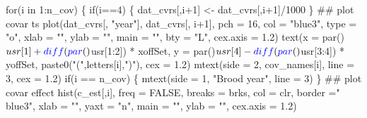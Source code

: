 \documentclass[11pt,]{article}
\newenvironment{Shaded}{}{}
\newcommand{\CommentTok}[1]{\textcolor[rgb]{0.00,0.50,0.00}{#1}}
\newcommand{\ControlFlowTok}[1]{\textcolor[rgb]{0.00,0.00,1.00}{#1}}
\newcommand{\DataTypeTok}[1]{#1}
\newcommand{\DecValTok}[1]{#1}
\newcommand{\FloatTok}[1]{#1}
\newcommand{\KeywordTok}[1]{\textcolor[rgb]{0.00,0.00,1.00}{#1}}
\newcommand{\NormalTok}[1]{#1}
\newcommand{\OperatorTok}[1]{#1}
\newcommand{\OtherTok}[1]{\textcolor[rgb]{1.00,0.25,0.00}{#1}}
\newcommand{\StringTok}[1]{\textcolor[rgb]{0.00,0.50,0.50}{#1}}
\begin{document}
\begin{Shaded}
\begin{Highlighting}[]
\ControlFlowTok{for}\NormalTok{(i }\ControlFlowTok{in} \DecValTok{1}\OperatorTok{:}\NormalTok{n_cov) \{}
  \ControlFlowTok{if}\NormalTok{(i}\OperatorTok{==}\DecValTok{4}\NormalTok{) \{}
\NormalTok{    dat_cvrs[,i}\OperatorTok{+}\DecValTok{1}\NormalTok{] <-}\StringTok{ }\NormalTok{dat_cvrs[,i}\OperatorTok{+}\DecValTok{1}\NormalTok{]}\OperatorTok{/}\DecValTok{1000}
\NormalTok{  \}}
  \CommentTok{## plot covar ts}
  \KeywordTok{plot}\NormalTok{(dat_cvrs[, }\StringTok{"year"}\NormalTok{], dat_cvrs[, i}\OperatorTok{+}\DecValTok{1}\NormalTok{],}
       \DataTypeTok{pch =} \DecValTok{16}\NormalTok{, }\DataTypeTok{col =} \StringTok{"blue3"}\NormalTok{, }\DataTypeTok{type =} \StringTok{"o"}\NormalTok{,}
       \DataTypeTok{xlab =} \StringTok{""}\NormalTok{, }\DataTypeTok{ylab =} \StringTok{""}\NormalTok{, }\DataTypeTok{main =} \StringTok{""}\NormalTok{, }\DataTypeTok{bty =} \StringTok{"L"}\NormalTok{,}
       \DataTypeTok{cex.axis =} \FloatTok{1.2}\NormalTok{)}
  \KeywordTok{text}\NormalTok{(}\DataTypeTok{x =} \KeywordTok{par}\NormalTok{()}\OperatorTok{$}\NormalTok{usr[}\DecValTok{1}\NormalTok{] }\OperatorTok{+}\StringTok{ }\KeywordTok{diff}\NormalTok{(}\KeywordTok{par}\NormalTok{()}\OperatorTok{$}\NormalTok{usr[}\DecValTok{1}\OperatorTok{:}\DecValTok{2}\NormalTok{]) }\OperatorTok{*}\StringTok{ }\NormalTok{xoffSet,}
       \DataTypeTok{y =} \KeywordTok{par}\NormalTok{()}\OperatorTok{$}\NormalTok{usr[}\DecValTok{4}\NormalTok{] }\OperatorTok{-}\StringTok{ }\KeywordTok{diff}\NormalTok{(}\KeywordTok{par}\NormalTok{()}\OperatorTok{$}\NormalTok{usr[}\DecValTok{3}\OperatorTok{:}\DecValTok{4}\NormalTok{]) }\OperatorTok{*}\StringTok{ }\NormalTok{yoffSet,}
       \KeywordTok{paste0}\NormalTok{(}\StringTok{"("}\NormalTok{,letters[i],}\StringTok{")"}\NormalTok{),}
       \DataTypeTok{cex =} \FloatTok{1.2}\NormalTok{)}
  \KeywordTok{mtext}\NormalTok{(}\DataTypeTok{side =} \DecValTok{2}\NormalTok{, cov_names[i], }\DataTypeTok{line =} \DecValTok{3}\NormalTok{, }\DataTypeTok{cex =} \FloatTok{1.2}\NormalTok{)}
  \ControlFlowTok{if}\NormalTok{(i }\OperatorTok{==}\StringTok{ }\NormalTok{n_cov) \{}
    \KeywordTok{mtext}\NormalTok{(}\DataTypeTok{side =} \DecValTok{1}\NormalTok{, }\StringTok{"Brood year"}\NormalTok{, }\DataTypeTok{line =} \DecValTok{3}\NormalTok{)}
\NormalTok{  \}}
  \CommentTok{## plot covar effect}
  \KeywordTok{hist}\NormalTok{(c_est[,i],}
       \DataTypeTok{freq =} \OtherTok{FALSE}\NormalTok{, }\DataTypeTok{breaks =}\NormalTok{ brks, }\DataTypeTok{col =}\NormalTok{ clr, }\DataTypeTok{border =}\StringTok{" blue3"}\NormalTok{,}
       \DataTypeTok{xlab =} \StringTok{""}\NormalTok{, }\DataTypeTok{yaxt =} \StringTok{"n"}\NormalTok{, }\DataTypeTok{main =} \StringTok{""}\NormalTok{, }\DataTypeTok{ylab =} \StringTok{""}\NormalTok{, }\DataTypeTok{cex.axis =} \FloatTok{1.2}\NormalTok{)}

\end{Highlighting}
\end{Shaded}
\end{document}
